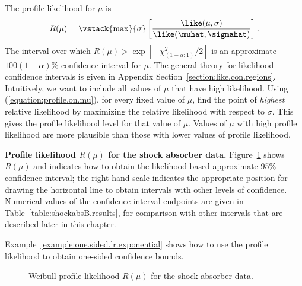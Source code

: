 The profile likelihood for $\mu$ is
\begin{equation}
\label{equation:profile.on.mu}
R(\mu) = \vstack{\max}{\sigma}
\left[\frac{\like(\mu,\sigma)}
{\like(\muhat, \sigmahat)}\right].
\end{equation}
The interval over which $R(\mu) >
\exp[-\chi^{2}_{(1-\alpha;1)}/2]$ is an approximate
$100(1-\alpha) \%$ confidence interval for $\mu$.  The general
theory for likelihood confidence intervals is given in
Appendix Section~\ref{section:like.con.regions}.  Intuitively, we want to
include all values of $\mu$ that have high likelihood. Using
(\ref{equation:profile.on.mu}), for every
fixed value of $\mu$, find the point of {\em highest} relative likelihood by
maximizing the relative
likelihood with respect to $\sigma$.
This gives the profile likelihood level for that
value of $\mu$. Values of $\mu$ with high profile
likelihood are more plausible than those with lower values of profile
likelihood.
\begin{example}
{\bf Profile likelihood $R(\mu)$ for the shock absorber data.}
Figure~\ref{figure:shockabsB.weib.muprofile.ps} shows $R(\mu)$ 
and indicates how to obtain the likelihood-based approximate 95\% 
confidence interval; the right-hand scale indicates the appropriate
position for drawing the horizontal line to obtain intervals with
other levels of confidence. Numerical values of the confidence
interval endpoints are given in Table~\ref{table:shockabsB.results}, for
comparison with other intervals that are described later in this chapter.
\end{example}
Example~\ref{example:one.sided.lr.exponential}
shows how to use the profile likelihood to
obtain one-sided confidence bounds.
\begin{figure}
\caption{Weibull profile likelihood $R(\mu)$ 
for the shock absorber data.}
\label{figure:shockabsB.weib.muprofile.ps}
\end{figure}
